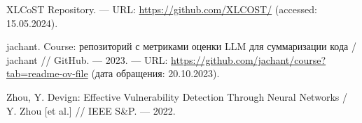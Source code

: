 \documentclass[14pt]{article}
\theoremstyle{definition}
\begin{document}
\begin{thebibliography}{99}
XLCoST Repository. — URL: \url{https://github.com/XLCOST/} (accessed: 15.05.2024).

jachant. Course: репозиторий с метриками оценки LLM для суммаризации кода / jachant // GitHub. — 2023. — URL: \url{https://github.com/jachant/course?tab=readme-ov-file} (дата обращения: 20.10.2023).

Zhou, Y. Devign: Effective Vulnerability Detection Through Neural Networks / Y. Zhou [et al.] // IEEE S\&P. — 2022.

\end{thebibliography}
\end{document}

